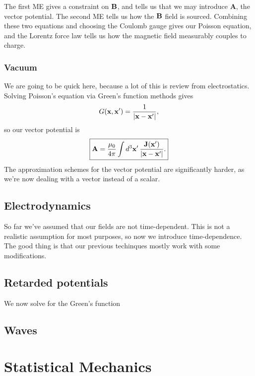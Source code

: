 \documentclass[11pt]{article}
\begin{document}
The first ME gives a constraint on $\mathbf{B}$, and tells us that
we may introduce $\mathbf{A}$, the vector potential. The second
ME tells us how the $\mathbf{B}$ field is sourced. Combining these two
equations and choosing the Coulomb gauge gives our Poisson
equation, and the Lorentz force law tells us how the magnetic
field measurably couples to charge.

\subsubsection{Vacuum}

We are going to be quick here, because a lot of this is review from
electrostatics. Solving Poisson's equation via Green's function
methods gives
\begin{align*}
    G(\mathbf{x}, \mathbf{x}') = \frac{1}{|\mathbf{x} - \mathbf{x}'|}, 
\end{align*}
so our vector potential is
\begin{align*}
    \boxed{\mathbf{A} = \frac{\mu_0}{4\pi} \int d^3 \mathbf{x}' \, \frac{\mathbf{J}(\mathbf{x}')}{|\mathbf{x} - \mathbf{x}'|}.}
\end{align*}
The approximation schemes for the vector potential are significantly
harder, as we're now dealing with a vector instead of a scalar.



\subsection{Electrodynamics}

So far we've assumed that our fields are not time-dependent.
This is not a realistic assumption for most purposes, so now
we introduce time-dependence. The good thing is that our previous 
techinques mostly work with some modifications.

\subsection{Retarded potentials}

We now solve for the Green's function 

\subsection{Waves}
\newpage

\section{Statistical Mechanics}
\end{document}
